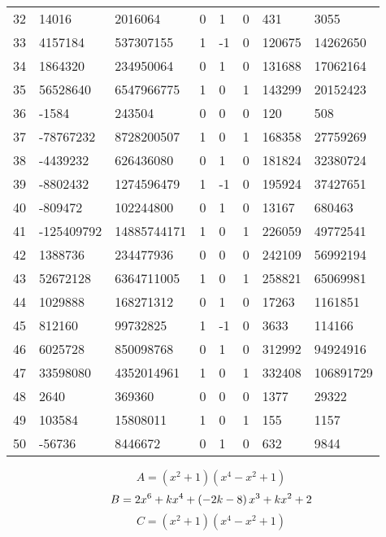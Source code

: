 \documentclass{amsart}
\begin{document}
\begin{longtable}{|l|l|l|lllll|}
32&14016&2016064&0&1&0&431&3055\\
33&4157184&537307155&1&-1&0&120675&14262650\\
34&1864320&234950064&0&1&0&131688&17062164\\
35&56528640&6547966775&1&0&1&143299&20152423\\
36&-1584&243504&0&0&0&120&508\\
37&-78767232&8728200507&1&0&1&168358&27759269\\
38&-4439232&626436080&0&1&0&181824&32380724\\
39&-8802432&1274596479&1&-1&0&195924&37427651\\
40&-809472&102244800&0&1&0&13167&680463\\
41&-125409792&14885744171&1&0&1&226059&49772541\\
42&1388736&234477936&0&0&0&242109&56992194\\
43&52672128&6364711005&1&0&1&258821&65069981\\
44&1029888&168271312&0&1&0&17263&1161851\\
45&812160&99732825&1&-1&0&3633&114166\\
46&6025728&850098768&0&1&0&312992&94924916\\
47&33598080&4352014961&1&0&1&332408&106891729\\
48&2640&369360&0&0&0&1377&29322\\
49&103584&15808011&1&0&1&155&1157\\
50&-56736&8446672&0&1&0&632&9844\\
\hline
\end{longtable}
$$A=(x^2
 + 1)(x^4
 - x^2
 + 1)$$
$$B=2\*x^6
 + k\*x^4
 + \left(-2\*k
 - 8\right) \*x^3
 + k\*x^2
 + 2$$
$$C=(x^2
 + 1)(x^4
 - x^2
 + 1)$$
\end{document}
